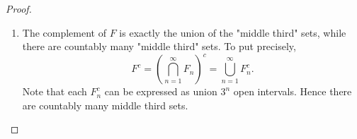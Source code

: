 \begin{enumerate}
\begin{proof}
\begin{enumerate}
\begin{proof}[Proof of 7.L]
	Therefore $a_n\ge b_n$ for all $n \in \mathbb{N}$. If $a_n>b _n$ then the interval is empty, so we have $I_n = \{x_n\} \subset \mathbf{F}$ for at most countable number of $I_n$, and the rest of them are empty. This is to say that the set $\mathbf{F}$ is at most countable. But we have concluded in Exercise 7.I that  $\mathbf{F}$ is not countable.
\end{proof}
		\item The complement of $F$ is exactly the union of the "middle third" sets, while there are countably many "middle third" sets. To put precisely, 
			\[
			F^c = \left( \bigcap_{n = 1} ^\infty  F_n \right) ^c = \bigcup_{n = 1} ^\infty F_n^c
		.\] 
		Note that each $F_n^c$ can be expressed as union $3^n$ open intervals. Hence there are countably many middle third sets.
	\end{enumerate}
\end{proof}
\end{enumerate}
